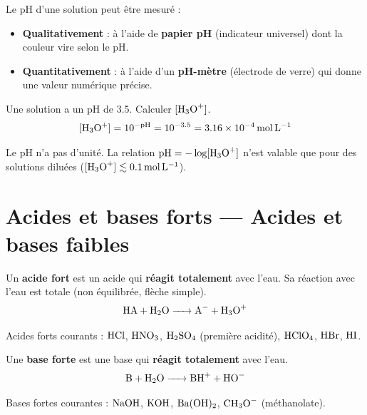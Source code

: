 \begin{experience}[Mesure du pH]
Le pH d'une solution peut être mesuré :
\begin{itemize}
    \item \textbf{Qualitativement} : à l'aide de \textbf{papier pH} (indicateur universel) dont la couleur vire selon le pH.
    \item \textbf{Quantitativement} : à l'aide d'un \textbf{pH-mètre} (électrode de verre) qui donne une valeur numérique précise.
\end{itemize}
\end{experience}

\begin{exemple}
Une solution a un pH de 3.5. Calculer $[\ce{H3O+}]$.
\[
[\ce{H3O+}] = 10^{-\text{pH}} = 10^{-3.5} = \SI{3.16e-4}{\mol\per\litre}
\]
\end{exemple}

\begin{remarque}
Le pH n'a pas d'unité. La relation $\text{pH} = -\log[\ce{H3O+}]$ n'est valable que pour des solutions diluées ($[\ce{H3O+}] \lesssim \SI{0.1}{\mol\per\litre}$).
\end{remarque}

\section{Acides et bases forts — Acides et bases faibles}

\begin{definition}
Un \textbf{acide fort} est un acide qui \textbf{réagit totalement} avec l'eau. Sa réaction avec l'eau est totale (non équilibrée, flèche simple).
\[
\ce{HA + H2O -> A- + H3O+}
\]
\end{definition}

\begin{exemple}
Acides forts courants : $\ce{HCl}$, $\ce{HNO3}$, $\ce{H2SO4}$ (première acidité), $\ce{HClO4}$, $\ce{HBr}$, $\ce{HI}$.
\end{exemple}

\begin{definition}
Une \textbf{base forte} est une base qui \textbf{réagit totalement} avec l'eau.
\[
\ce{B + H2O -> BH+ + HO-}
\]
\end{definition}

\begin{exemple}
Bases fortes courantes : $\ce{NaOH}$, $\ce{KOH}$, $\ce{Ba(OH)2}$, $\ce{CH3O-}$ (méthanolate).
\end{exemple}

